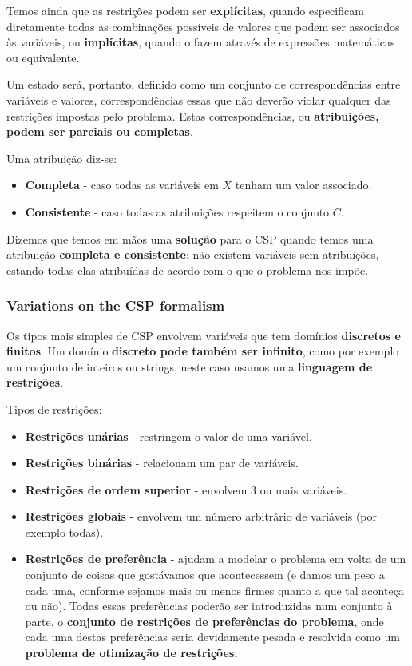 \documentclass[11pt]{article}
\begin{document}
Temos ainda que as restrições podem ser \textbf{explícitas}, quando especificam diretamente todas as combinações possíveis de valores que podem ser associados às variáveis, ou \textbf{implícitas}, quando o fazem através de expressões matemáticas ou equivalente.\vspace{10pt}

Um estado será, portanto, definido como um conjunto de correspondências entre variáveis e valores, correspondências essas que não deverão violar qualquer das restrições impostas pelo problema. Estas correspondências, ou \textbf{atribuições, podem ser parciais ou completas}.\vspace{4pt}

Uma atribuição diz-se:
\begin{itemize}[topsep=4pt,itemsep=0pt]
    \item \textbf{Completa} - caso todas as variáveis em $X$ tenham um valor associado.
    \item \textbf{Consistente} - caso todas as atribuições respeitem o conjunto $C$.
\end{itemize}\vspace{10pt}

Dizemos que temos em mãos uma \textbf{solução} para o CSP quando temos uma atribuição \textbf{completa e consistente}: não existem variáveis sem atribuições, estando todas elas atribuídas de acordo com o que o problema nos impõe.

\subsubsection{Variations on the CSP formalism}

Os tipos mais simples de CSP envolvem variáveis que tem domínios \textbf{discretos e finitos}. Um domínio \textbf{discreto pode também ser infinito}, como por exemplo um conjunto de inteiros ou strings, neste caso usamos uma \textbf{linguagem de restrições}.\vspace{10pt}

Tipos de restrições:
\begin{itemize}
    \item \textbf{Restrições unárias} - restringem o valor de uma variável.
    \item \textbf{Restrições binárias} - relacionam um par de variáveis.
    \item \textbf{Restrições de ordem superior} - envolvem 3 ou mais variáveis.
    \item \textbf{Restrições globais} - envolvem um número arbitrário de variáveis (por exemplo todas).
    \item \textbf{Restrições de preferência} - ajudam a modelar o problema em volta de um conjunto de coisas que gostávamos que acontecessem (e damos um peso a cada uma, conforme sejamos mais ou menos firmes quanto a que tal aconteça ou não). Todas essas preferências poderão ser introduzidas num conjunto à parte, o \textbf{conjunto de restrições de preferências do problema}, onde cada uma destas preferências seria devidamente pesada e resolvida como um \textbf{problema de otimização de restrições.}
\end{itemize}
\end{document}
